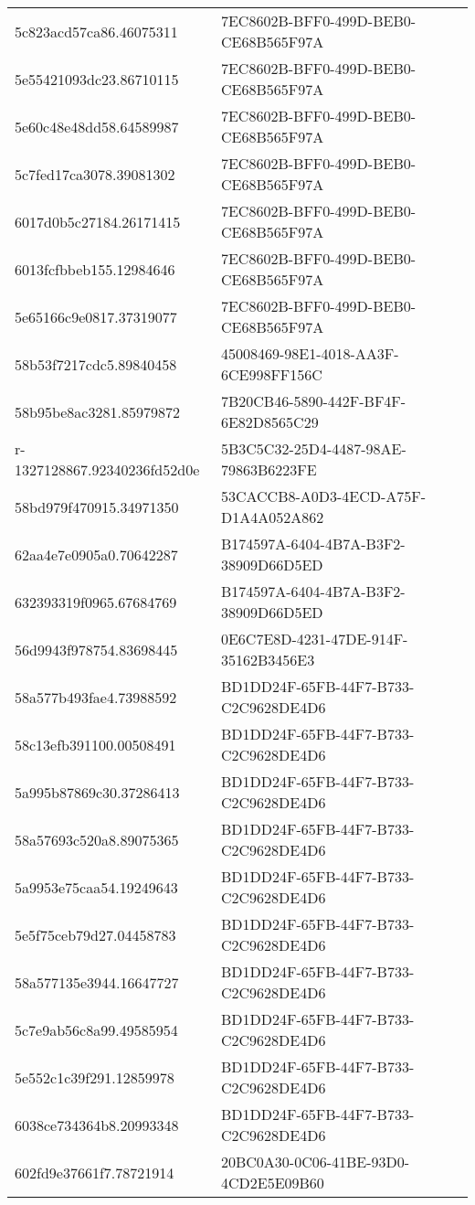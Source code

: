 \begin{tabular}{ll}
5c823acd57ca86.46075311 & 7EC8602B-BFF0-499D-BEB0-CE68B565F97A \\
5e55421093dc23.86710115 & 7EC8602B-BFF0-499D-BEB0-CE68B565F97A \\
5e60c48e48dd58.64589987 & 7EC8602B-BFF0-499D-BEB0-CE68B565F97A \\
5c7fed17ca3078.39081302 & 7EC8602B-BFF0-499D-BEB0-CE68B565F97A \\
6017d0b5c27184.26171415 & 7EC8602B-BFF0-499D-BEB0-CE68B565F97A \\
6013fcfbbeb155.12984646 & 7EC8602B-BFF0-499D-BEB0-CE68B565F97A \\
5e65166c9e0817.37319077 & 7EC8602B-BFF0-499D-BEB0-CE68B565F97A \\
58b53f7217cdc5.89840458 & 45008469-98E1-4018-AA3F-6CE998FF156C \\
58b95be8ac3281.85979872 & 7B20CB46-5890-442F-BF4F-6E82D8565C29 \\
r-1327128867.92340236fd52d0e & 5B3C5C32-25D4-4487-98AE-79863B6223FE \\
58bd979f470915.34971350 & 53CACCB8-A0D3-4ECD-A75F-D1A4A052A862 \\
62aa4e7e0905a0.70642287 & B174597A-6404-4B7A-B3F2-38909D66D5ED \\
632393319f0965.67684769 & B174597A-6404-4B7A-B3F2-38909D66D5ED \\
56d9943f978754.83698445 & 0E6C7E8D-4231-47DE-914F-35162B3456E3 \\
58a577b493fae4.73988592 & BD1DD24F-65FB-44F7-B733-C2C9628DE4D6 \\
58c13efb391100.00508491 & BD1DD24F-65FB-44F7-B733-C2C9628DE4D6 \\
5a995b87869c30.37286413 & BD1DD24F-65FB-44F7-B733-C2C9628DE4D6 \\
58a57693c520a8.89075365 & BD1DD24F-65FB-44F7-B733-C2C9628DE4D6 \\
5a9953e75caa54.19249643 & BD1DD24F-65FB-44F7-B733-C2C9628DE4D6 \\
5e5f75ceb79d27.04458783 & BD1DD24F-65FB-44F7-B733-C2C9628DE4D6 \\
58a577135e3944.16647727 & BD1DD24F-65FB-44F7-B733-C2C9628DE4D6 \\
5c7e9ab56c8a99.49585954 & BD1DD24F-65FB-44F7-B733-C2C9628DE4D6 \\
5e552c1c39f291.12859978 & BD1DD24F-65FB-44F7-B733-C2C9628DE4D6 \\
6038ce734364b8.20993348 & BD1DD24F-65FB-44F7-B733-C2C9628DE4D6 \\
602fd9e37661f7.78721914 & 20BC0A30-0C06-41BE-93D0-4CD2E5E09B60 \\

\end{tabular}
